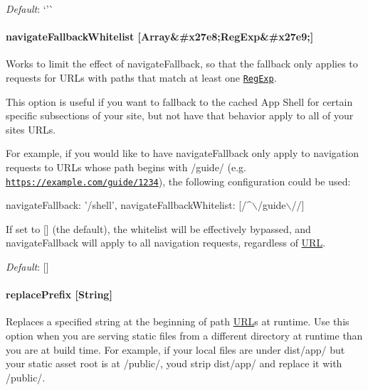 {\itshape Default}\+: `'\textquotesingle{}\`{}

\paragraph*{navigate\+Fallback\+Whitelist \mbox{[}Array\&\#x27e8;Reg\+Exp\&\#x27e9;\mbox{]}}

Works to limit the effect of {\ttfamily navigate\+Fallback}, so that the fallback only applies to requests for U\+R\+Ls with paths that match at least one \href{https://developer.mozilla.org/en-US/docs/Web/JavaScript/Reference/Global_Objects/RegExp}{\tt {\ttfamily Reg\+Exp}}.

This option is useful if you want to fallback to the cached App Shell for certain specific subsections of your site, but not have that behavior apply to all of your site\textquotesingle{}s U\+R\+Ls.

For example, if you would like to have {\ttfamily navigate\+Fallback} only apply to navigation requests to U\+R\+Ls whose path begins with {\ttfamily /guide/} (e.\+g. {\ttfamily \href{https://example.com/guide/1234}{\tt https\+://example.\+com/guide/1234}}), the following configuration could be used\+:


\begin{DoxyCode}
navigateFallback: '/shell',
navigateFallbackWhitelist: [/^\(\backslash\)/guide\(\backslash\)//]
\end{DoxyCode}


If set to {\ttfamily \mbox{[}\mbox{]}} (the default), the whitelist will be effectively bypassed, and {\ttfamily navigate\+Fallback} will apply to all navigation requests, regardless of \mbox{\hyperlink{namespace_u_r_l}{U\+RL}}.

{\itshape Default}\+: {\ttfamily \mbox{[}\mbox{]}}

\paragraph*{replace\+Prefix \mbox{[}String\mbox{]}}

Replaces a specified string at the beginning of path \mbox{\hyperlink{namespace_u_r_l}{U\+RL}}\textquotesingle{}s at runtime. Use this option when you are serving static files from a different directory at runtime than you are at build time. For example, if your local files are under {\ttfamily dist/app/} but your static asset root is at {\ttfamily /public/}, you\textquotesingle{}d strip \textquotesingle{}dist/app/\textquotesingle{} and replace it with \textquotesingle{}/public/\textquotesingle{}.

